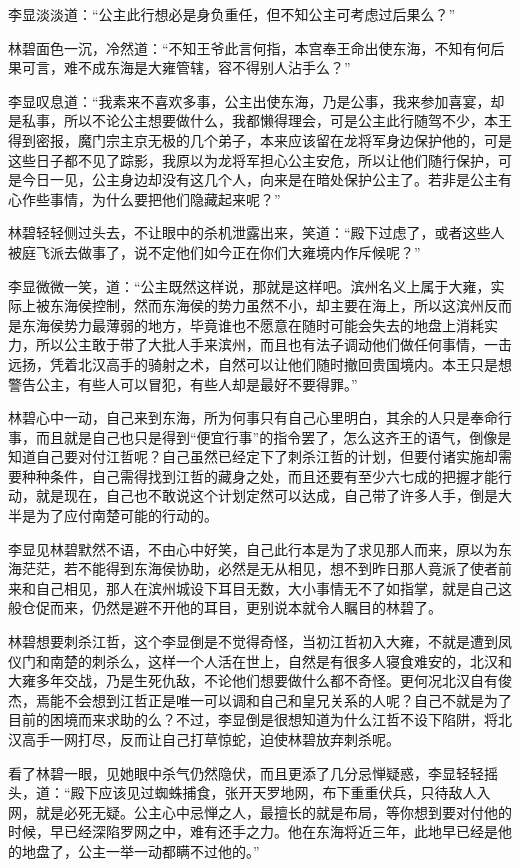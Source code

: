 李显淡淡道：“公主此行想必是身负重任，但不知公主可考虑过后果么？”

林碧面色一沉，冷然道：“不知王爷此言何指，本宫奉王命出使东海，不知有何后果可言，难不成东海是大雍管辖，容不得别人沾手么？”

李显叹息道：“我素来不喜欢多事，公主出使东海，乃是公事，我来参加喜宴，却是私事，所以不论公主想要做什么，我都懒得理会，可是公主此行随驾不少，本王得到密报，魔门宗主京无极的几个弟子，本来应该留在龙将军身边保护他的，可是这些日子都不见了踪影，我原以为龙将军担心公主安危，所以让他们随行保护，可是今日一见，公主身边却没有这几个人，向来是在暗处保护公主了。若非是公主有心作些事情，为什么要把他们隐藏起来呢？”

林碧轻轻侧过头去，不让眼中的杀机泄露出来，笑道：“殿下过虑了，或者这些人被庭飞派去做事了，说不定他们如今正在你们大雍境内作斥候呢？”

李显微微一笑，道：“公主既然这样说，那就是这样吧。滨州名义上属于大雍，实际上被东海侯控制，然而东海侯的势力虽然不小，却主要在海上，所以这滨州反而是东海侯势力最薄弱的地方，毕竟谁也不愿意在随时可能会失去的地盘上消耗实力，所以公主敢于带了大批人手来滨州，而且也有法子调动他们做任何事情，一击远扬，凭着北汉高手的骑射之术，自然可以让他们随时撤回贵国境内。本王只是想警告公主，有些人可以冒犯，有些人却是最好不要得罪。”

林碧心中一动，自己来到东海，所为何事只有自己心里明白，其余的人只是奉命行事，而且就是自己也只是得到“便宜行事”的指令罢了，怎么这齐王的语气，倒像是知道自己要对付江哲呢？自己虽然已经定下了刺杀江哲的计划，但要付诸实施却需要种种条件，自己需得找到江哲的藏身之处，而且还要有至少六七成的把握才能行动，就是现在，自己也不敢说这个计划定然可以达成，自己带了许多人手，倒是大半是为了应付南楚可能的行动的。

李显见林碧默然不语，不由心中好笑，自己此行本是为了求见那人而来，原以为东海茫茫，若不能得到东海侯协助，必然是无从相见，想不到昨日那人竟派了使者前来和自己相见，那人在滨州城设下耳目无数，大小事情无不了如指掌，就是自己这般仓促而来，仍然是避不开他的耳目，更别说本就令人瞩目的林碧了。

林碧想要刺杀江哲，这个李显倒是不觉得奇怪，当初江哲初入大雍，不就是遭到凤仪门和南楚的刺杀么，这样一个人活在世上，自然是有很多人寝食难安的，北汉和大雍多年交战，乃是生死仇敌，不论他们想要做什么都不奇怪。更何况北汉自有俊杰，焉能不会想到江哲正是唯一可以调和自己和皇兄关系的人呢？自己不就是为了目前的困境而来求助的么？不过，李显倒是很想知道为什么江哲不设下陷阱，将北汉高手一网打尽，反而让自己打草惊蛇，迫使林碧放弃刺杀呢。

看了林碧一眼，见她眼中杀气仍然隐伏，而且更添了几分忌惮疑惑，李显轻轻摇头，道：“殿下应该见过蜘蛛捕食，张开天罗地网，布下重重伏兵，只待敌人入网，就是必死无疑。公主心中忌惮之人，最擅长的就是布局，等你想到要对付他的时候，早已经深陷罗网之中，难有还手之力。他在东海将近三年，此地早已经是他的地盘了，公主一举一动都瞒不过他的。”

